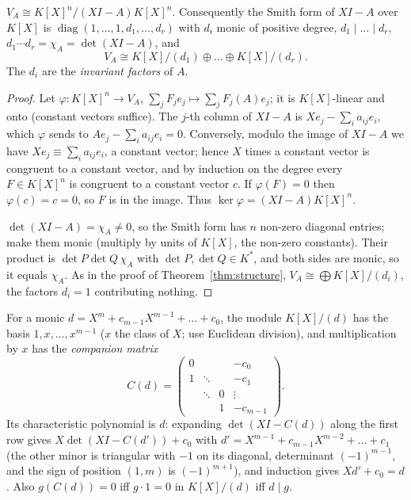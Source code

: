 \begin{proposition}\label{prop:presentation}
$V_A\cong K[X]^n/(XI-A)K[X]^n$. Consequently the Smith form of $XI-A$ over $K[X]$ is $\operatorname{diag}(1,\dots,1,d_1,\dots,d_r)$ with $d_i$ monic of positive degree, $d_1\mid\dots\mid d_r$, $d_1\cdots d_r=\chi_A=\det(XI-A)$, and
\[
V_A\cong K[X]/(d_1)\oplus\dots\oplus K[X]/(d_r).
\]
The $d_i$ are the \emph{invariant factors} of $A$.
\end{proposition}
\begin{proof}
Let $\varphi:K[X]^n\to V_A$, $\sum_jF_je_j\mapsto\sum_jF_j(A)e_j$; it is $K[X]$-linear and onto (constant vectors suffice). The $j$-th column of $XI-A$ is $Xe_j-\sum_ia_{ij}e_i$, which $\varphi$ sends to $Ae_j-\sum_ia_{ij}e_i=0$. Conversely, modulo the image of $XI-A$ we have $Xe_j\equiv\sum_ia_{ij}e_i$, a constant vector; hence $X$ times a constant vector is congruent to a constant vector, and by induction on the degree every $F\in K[X]^n$ is congruent to a constant vector $c$. If $\varphi(F)=0$ then $\varphi(c)=c=0$, so $F$ is in the image. Thus $\ker\varphi=(XI-A)K[X]^n$.

$\det(XI-A)=\chi_A\ne0$, so the Smith form has $n$ non-zero diagonal entries; make them monic (multiply by units of $K[X]$, the non-zero constants). Their product is $\det P\det Q\,\chi_A$ with $\det P,\det Q\in K^*$, and both sides are monic, so it equals $\chi_A$. As in the proof of Theorem~\ref{thm:structure}, $V_A\cong\bigoplus K[X]/(d_i)$, the factors $d_i=1$ contributing nothing.
\end{proof}

For a monic $d=X^m+c_{m-1}X^{m-1}+\dots+c_0$, the module $K[X]/(d)$ has the basis $1,x,\dots,x^{m-1}$ ($x$ the class of $X$; use Euclidean division), and multiplication by $x$ has the \emph{companion matrix}
\[
C(d)=\begin{pmatrix}0&&&-c_0\\1&\ddots&&-c_1\\&\ddots&0&\vdots\\&&1&-c_{m-1}\end{pmatrix}.
\]
Its characteristic polynomial is $d$: expanding $\det(XI-C(d))$ along the first row gives $X\det(XI-C(d'))+c_0$ with $d'=X^{m-1}+c_{m-1}X^{m-2}+\dots+c_1$ (the other minor is triangular with $-1$ on its diagonal, determinant $(-1)^{m-1}$, and the sign of position $(1,m)$ is $(-1)^{m+1}$), and induction gives $Xd'+c_0=d$. Also $g(C(d))=0$ iff $g\cdot1=0$ in $K[X]/(d)$ iff $d\mid g$.

